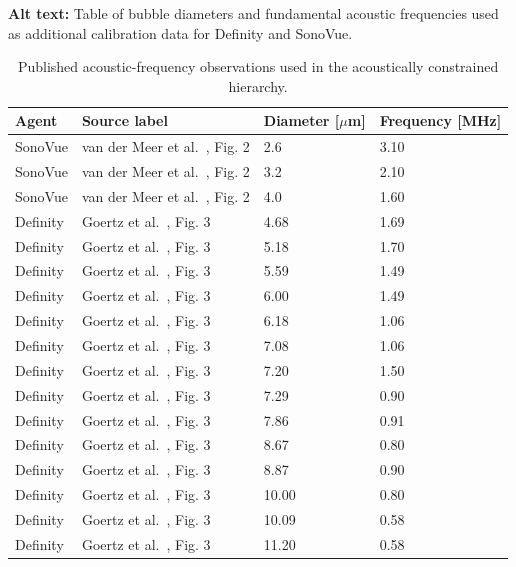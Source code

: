 \documentclass[%
 aip,
 jcp,
 amsmath,amssymb,
 preprint,%
]{revtex4-1}
\begin{document}
\begin{table}[!htbp]
\caption{\label{tab:resonance_data_summary}
Published acoustic-frequency observations used in the acoustically constrained hierarchy.}
\noindent\textbf{Alt text:} Table of bubble diameters and fundamental acoustic frequencies used as additional calibration data for Definity and SonoVue.
\par\vspace{0.75\baselineskip}
\begin{center}
\scriptsize
\begin{tabular}{llll}
\hline
Agent & Source label & Diameter [$\mu$m] & Frequency [MHz] \\
\hline
SonoVue & van der Meer et al.\ \cite{vandermeer2004sonovue}, Fig. 2 & 2.6 & 3.10 \\
SonoVue & van der Meer et al.\ \cite{vandermeer2004sonovue}, Fig. 2 & 3.2 & 2.10 \\
SonoVue & van der Meer et al.\ \cite{vandermeer2004sonovue}, Fig. 2 & 4.0 & 1.60 \\
Definity & Goertz et al.\ \cite{goertz2006pulse}, Fig. 3 & 4.68 & 1.69 \\
Definity & Goertz et al.\ \cite{goertz2006pulse}, Fig. 3 & 5.18 & 1.70 \\
Definity & Goertz et al.\ \cite{goertz2006pulse}, Fig. 3 & 5.59 & 1.49 \\
Definity & Goertz et al.\ \cite{goertz2006pulse}, Fig. 3 & 6.00 & 1.49 \\
Definity & Goertz et al.\ \cite{goertz2006pulse}, Fig. 3 & 6.18 & 1.06 \\
Definity & Goertz et al.\ \cite{goertz2006pulse}, Fig. 3 & 7.08 & 1.06 \\
Definity & Goertz et al.\ \cite{goertz2006pulse}, Fig. 3 & 7.20 & 1.50 \\
Definity & Goertz et al.\ \cite{goertz2006pulse}, Fig. 3 & 7.29 & 0.90 \\
Definity & Goertz et al.\ \cite{goertz2006pulse}, Fig. 3 & 7.86 & 0.91 \\
Definity & Goertz et al.\ \cite{goertz2006pulse}, Fig. 3 & 8.67 & 0.80 \\
Definity & Goertz et al.\ \cite{goertz2006pulse}, Fig. 3 & 8.87 & 0.90 \\
Definity & Goertz et al.\ \cite{goertz2006pulse}, Fig. 3 & 10.00 & 0.80 \\
Definity & Goertz et al.\ \cite{goertz2006pulse}, Fig. 3 & 10.09 & 0.58 \\
Definity & Goertz et al.\ \cite{goertz2006pulse}, Fig. 3 & 11.20 & 0.58 \\
\hline
\end{tabular}
\end{center}
\end{table}
\end{document}
